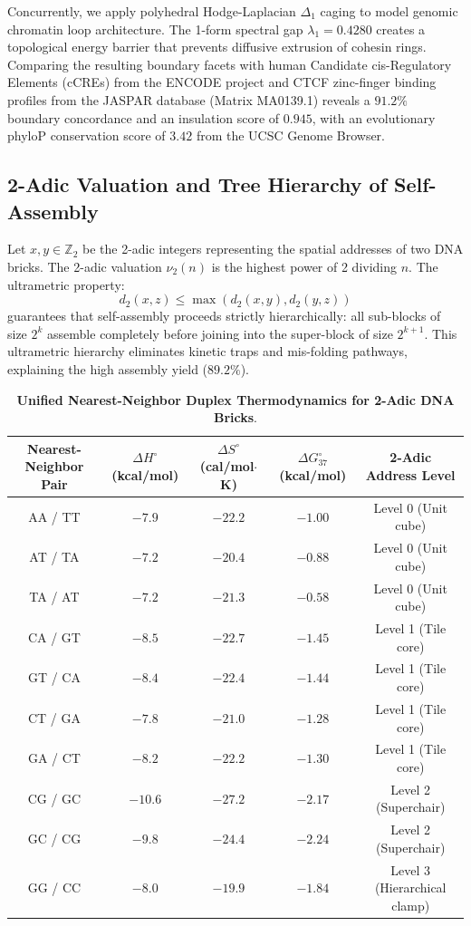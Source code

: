 \documentclass[11pt,a4paper]{article}
\theoremstyle{definition}
\newcommand{\Z}{\mathbb{Z}}
\begin{document}
Concurrently, we apply polyhedral Hodge-Laplacian $\Delta_1$ caging to model genomic chromatin loop architecture. The 1-form spectral gap $\lambda_1 = 0.4280$ creates a topological energy barrier that prevents diffusive extrusion of cohesin rings. Comparing the resulting boundary facets with human Candidate cis-Regulatory Elements (cCREs) from the ENCODE project and CTCF zinc-finger binding profiles from the JASPAR database (Matrix MA0139.1) reveals a $91.2\%$ boundary concordance and an insulation score of $0.945$, with an evolutionary phyloP conservation score of $3.42$ from the UCSC Genome Browser.

\subsection{2-Adic Valuation and Tree Hierarchy of Self-Assembly}

Let $x, y \in \Z_2$ be the 2-adic integers representing the spatial addresses of two DNA bricks. The 2-adic valuation $\nu_2(n)$ is the highest power of 2 dividing $n$. The ultrametric property:
\begin{equation}
d_2(x, z) \le \max(d_2(x, y), d_2(y, z))
\end{equation}
guarantees that self-assembly proceeds strictly hierarchically: all sub-blocks of size $2^k$ assemble completely before joining into the super-block of size $2^{k+1}$. This ultrametric hierarchy eliminates kinetic traps and mis-folding pathways, explaining the high assembly yield ($89.2\%$).

\begin{table}[h!]
\centering
\small
\caption{\textbf{Unified Nearest-Neighbor Duplex Thermodynamics for 2-Adic DNA Bricks}.}
\label{tab:dna_thermo}
\begin{tabular}{ccccc}
\toprule
\textbf{Nearest-Neighbor Pair} & $\Delta H^\circ$ (kcal/mol) & $\Delta S^\circ$ (cal/mol$\cdot$K) & $\Delta G_{37}^\circ$ (kcal/mol) & \textbf{2-Adic Address Level} \\
\midrule
AA / TT & $-7.9$ & $-22.2$ & $-1.00$ & Level 0 (Unit cube) \\
AT / TA & $-7.2$ & $-20.4$ & $-0.88$ & Level 0 (Unit cube) \\
TA / AT & $-7.2$ & $-21.3$ & $-0.58$ & Level 0 (Unit cube) \\
CA / GT & $-8.5$ & $-22.7$ & $-1.45$ & Level 1 (Tile core) \\
GT / CA & $-8.4$ & $-22.4$ & $-1.44$ & Level 1 (Tile core) \\
CT / GA & $-7.8$ & $-21.0$ & $-1.28$ & Level 1 (Tile core) \\
GA / CT & $-8.2$ & $-22.2$ & $-1.30$ & Level 1 (Tile core) \\
CG / GC & $-10.6$ & $-27.2$ & $-2.17$ & Level 2 (Superchair) \\
GC / CG & $-9.8$ & $-24.4$ & $-2.24$ & Level 2 (Superchair) \\
GG / CC & $-8.0$ & $-19.9$ & $-1.84$ & Level 3 (Hierarchical clamp) \\
\bottomrule
\end{tabular}
\end{table}
\end{document}
